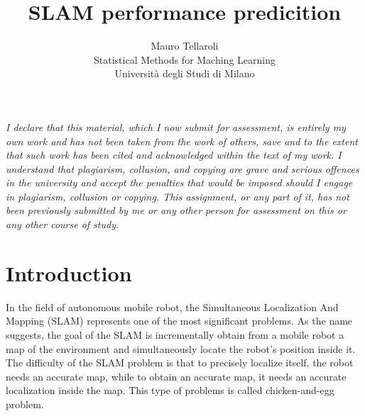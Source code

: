 \documentclass[a4paper]{article}
\title{SLAM performance predicition}
\author{Mauro Tellaroli \\ 
    \small Statistical Methods for Maching Learning \\ 
    \small Università degli Studi di Milano
}
\date{}
\begin{document}
\maketitle

\begin{center}
\begin{minipage}{0.9\textwidth}\textit{
I declare that this material, which I now submit for assessment, is entirely my own work and has 
not been taken from the work of others, save and to the extent that such work has been cited and 
acknowledged within the text of my work. I understand that plagiarism, collusion, and copying 
are grave and serious offences in the university and accept the penalties that would be imposed should 
I engage in plagiarism, collusion or copying. This assignment, or any part of it, has not been previously 
submitted by me or any other person for assessment on this or any other course of study.}
\end{minipage}
\end{center}
\vspace{2em}

\section{Introduction}
In the field of autonomous mobile robot, the Simultaneous Localization And Mapping (SLAM) represents
one of the most significant problems. As the name suggests, the goal of the SLAM is incrementally obtain 
from a mobile robot a map of the environment and simultaneously locate the robot's position inside it.
The difficulty of the SLAM problem is that to precisely localize itself, the robot needs an accurate map,
while to obtain an accurate map, it needs an accurate localization inside the map. This type of problems is 
called chicken-and-egg problem.
\end{document}
